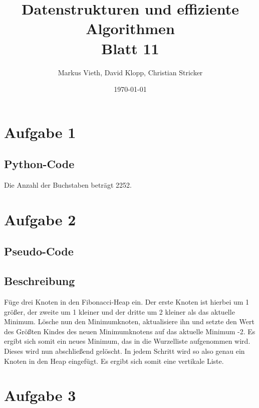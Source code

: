\documentclass[a4paper,11pt,twoside]{scrartcl}
\title{Datenstrukturen und effiziente Algorithmen\\ Blatt 11}
\author{Markus Vieth, David Klopp, Christian Stricker}
\date{\today}
\begin{document}
\maketitle
\cleardoublepage
\pagestyle{myheadings}

\section*{Aufgabe 1}
\subsection*{Python-Code}


Die Anzahl der Buchstaben beträgt 2252.



\section*{Aufgabe 2}

\subsection*{Pseudo-Code}


\subsection*{Beschreibung}
Füge drei Knoten in den Fibonacci-Heap ein. Der erste Knoten ist hierbei um 1 größer, der zweite um 1 kleiner und der dritte um 2 kleiner als das aktuelle Minimum. Lösche nun den Minimumknoten, aktualisiere ihn und setzte den Wert des Größten Kindes des neuen Minimumknotens auf das aktuelle Minimum -2. Es ergibt sich somit ein neues Minimum, das in die Wurzelliste aufgenommen wird. Dieses wird nun abschließend gelöscht. In jedem Schritt wird so also genau ein Knoten in den Heap eingefügt. Es ergibt sich somit eine vertikale Liste.


\pagebreak

\section*{Aufgabe 3}
\end{document}
